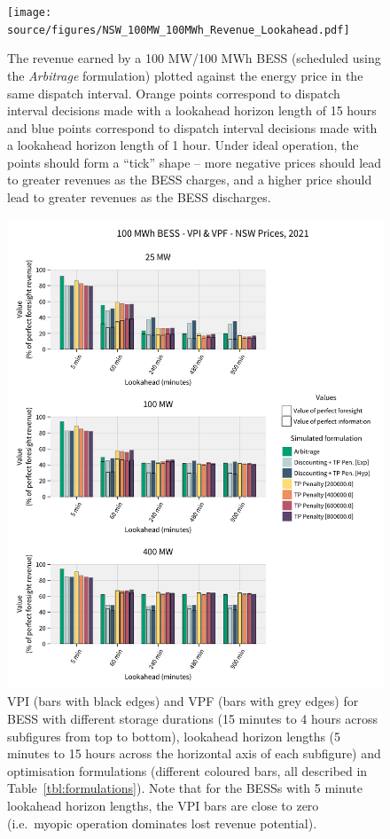 \documentclass[12pt,a4paper,]{report}
\begin{document}
\begin{figure}
\hypertarget{fig:bess_price_revenue}{%
\centering
\texttt{[image: source/figures/NSW\_100MW\_100MWh\_Revenue\_Lookahead.pdf]}
\caption[Revenue vs energy price for simulated BESSs with 1 hour storage
duration over the simulated year (2021)]{The revenue earned by a 100
MW/100 MWh BESS (scheduled using the \emph{Arbitrage} formulation)
plotted against the energy price in the same dispatch interval. Orange
points correspond to dispatch interval decisions made with a lookahead
horizon length of 15 hours and blue points correspond to dispatch
interval decisions made with a lookahead horizon length of 1 hour. Under
ideal operation, the points should form a ``tick'' shape -- more
negative prices should lead to greater revenues as the BESS charges, and
a higher price should lead to greater revenues as the BESS
discharges.}\label{fig:bess_price_revenue}
}
\end{figure}

\begin{figure}
\hypertarget{fig:vpi_vpf}{%
\centering
\includegraphics{source/figures/NSW_100_allformulations_vpi_vpf.pdf}
\caption[Value of perfect information and foresight for each simulated
BESS]{VPI (bars with black edges) and VPF (bars with grey edges) for
BESS with different storage durations (15 minutes to 4 hours across
subfigures from top to bottom), lookahead horizon lengths (5 minutes to
15 hours across the horizontal axis of each subfigure) and optimisation
formulations (different coloured bars, all described in
Table~\ref{tbl:formulations}). Note that for the BESSs with 5 minute
lookahead horizon lengths, the VPI bars are close to zero (i.e.~myopic
operation dominates lost revenue potential).}\label{fig:vpi_vpf}
}
\end{figure}
\end{document}

